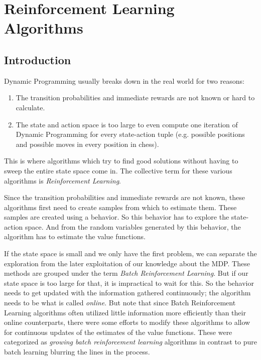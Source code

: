 
\chapter{Reinforcement Learning Algorithms}

\section{Introduction}

Dynamic Programming usually breaks down in the real world for two reasons:
\begin{enumerate}
    \item The transition probabilities and immediate rewards are not known or hard to calculate.
    \item The state and action space is too large to even compute one iteration of Dynamic Programming for every state-action tuple (e.g. possible positions and possible moves in every position in chess).
\end{enumerate}

This is where algorithms which try to find good solutions without having to sweep the entire state space come in. The collective term for these various algorithms is \emph{Reinforcement Learning}.

Since the transition probabilities and immediate rewards are not known, these algorithms first need to create samples from which to estimate them. These samples are created using a behavior. So this behavior has to explore the state-action space. And from the random variables generated by this behavior, the algorithm has to estimate the value functions. 

If the state space is small and we only have the first problem, we can separate the exploration from the later exploitation of our knowledge about the MDP. These methods are grouped under the term \emph{Batch Reinforcement Learning}. But if our state space is too large for that, it is impractical to wait for this. So the behavior needs to get updated with the information gathered continuously; the algorithm needs to be what is called \emph{online}. But note that since Batch Reinforcement Learning algorithms often utilized little information more efficiently than their online counterparts, there were some efforts to modify these algorithms to allow for continuous updates of the estimates of the value functions. These were categorized as \emph{growing batch reinforcement learning} algorithms in contrast to pure batch learning \parencite{langeBatchReinforcementLearning2012} blurring the lines in the process.

